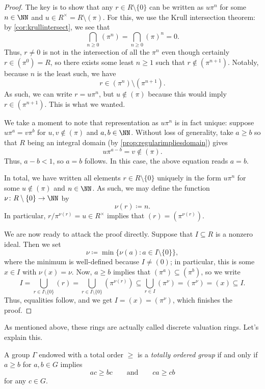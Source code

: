 \begin{proof}
	The key is to show that any $r\in R\setminus\{0\}$ can be written as $u\pi^n$ for some $n\in\NN$ and $u\in R^\times=R\setminus(\pi)$. For this, we use the Krull intersection theorem: by \autoref{cor:krullintersect}, we see that
	\[\bigcap_{n\ge0}\left(\pi^n\right)=\bigcap_{n\ge0}\left(\pi\right)^n=0.\]
	Thus, $r\ne0$ is not in the intersection of all the $\pi^n$ even though certainly $r\in\left(\pi^0\right)=R$, so there exists some least $n\ge1$ such that $r\notin\left(\pi^{n+1}\right)$. Notably, because $n$ is the least such, we have
	\[r\in\left(\pi^n\right)\setminus\left(\pi^{n+1}\right).\]
	As such, we can write $r=u\pi^n$, but $u\notin(\pi)$ because this would imply $r\in\left(\pi^{n+1}\right)$. This is what we wanted.

	We take a moment to note that representation as $u\pi^n$ is in fact unique: suppose $u\pi^a=v\pi^b$ for $u,v\notin(\pi)$ and $a,b\in\NN$. Without loss of generality, take $a\ge b$ so that $R$ being an integral domain (by \autoref{prop:regularimpliesdomain}) gives
	\[u\pi^{a-b}=v\notin(\pi).\]
	Thus, $a-b<1$, so $a=b$ follows. In this case, the above equation reads $a=b$.
	
	In total, we have written all elements $r\in R\setminus\{0\}$ uniquely in the form $u\pi^n$ for some $u\notin(\pi)$ and $n\in\NN$. As such, we may define the function $\nu\colon R\setminus\{0\}\to\NN$ by
	\[\nu(r)\coloneqq n.\]
	In particular, $r/\pi^{\nu(r)}=u\in R^\times$ implies that $(r)=\left(\pi^{\nu(r)}\right)$.
	
	We are now ready to attack the proof directly. Suppose that $I\subseteq R$ is a nonzero ideal. Then we set
	\[\nu\coloneqq\min\{\nu(a):a\in I\setminus\{0\}\},\]
	where the minimum is well-defined because $I\ne(0)$; in particular, this is some $x\in I$ with $\nu(x)=\nu$. Now, $a\ge b$ implies that $\left(\pi^a\right)\subseteq\left(\pi^b\right)$, so we write
	\[I=\bigcup_{r\in I\setminus\{0\}}(r)=\bigcup_{r\in I\setminus\{0\}}\left(\pi^{\nu(r)}\right)\subseteq\bigcup_{r\in I}\left(\pi^\nu\right)=\left(\pi^\nu\right)=(x)\subseteq I.\]
	Thus, equalities follow, and we get $I=(x)=\left(\pi^\nu\right)$, which finishes the proof.
\end{proof}
As mentioned above, these rings are actually called discrete valuation rings. Let's explain this.
\begin{definition}
	A group $\Gamma$ endowed with a total order $\ge$ is a \textit{totally ordered group} if and only if $a\ge b$ for $a,b\in G$ implies
	\[ac\ge bc\qquad\text{and}\qquad ca\ge cb\]
	for any $c\in G$.
\end{definition}
